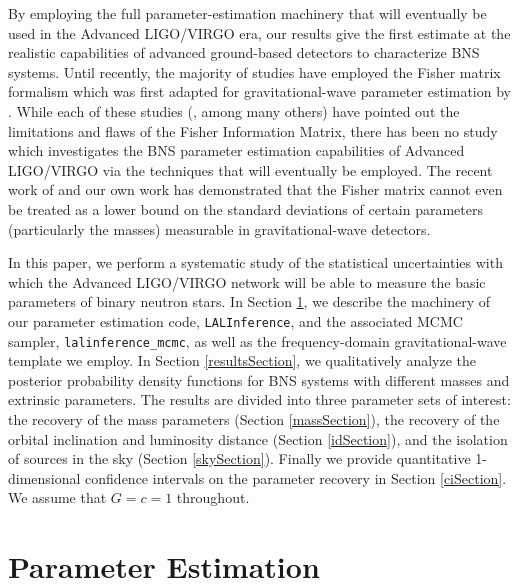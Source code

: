\documentclass[11pt,a4paper]{emulateapj}
\begin{document}
By employing the full parameter-estimation machinery that will eventually be
used in the Advanced LIGO/VIRGO era, our results give the first estimate at the 
realistic capabilities of advanced ground-based detectors to characterize BNS systems.
  Until recently, the majority of studies have employed the Fisher matrix formalism which was 
first adapted for gravitational-wave parameter estimation by \citep{FinnDetection}.
While each of these studies (\cite{PoissonWill,CutlerFlanagan,ArunPE}, among 
many others) have pointed out the limitations 
and flaws of the Fisher Information Matrix, there has been no study which investigates
the BNS parameter estimation capabilities of Advanced LIGO/VIRGO via the techniques
that will eventually be employed.  The recent work of \cite{Vallisneri} and our 
own work \citep{Inadequacies} has demonstrated that the Fisher matrix cannot even
be treated as a lower bound on the standard deviations of certain parameters
(particularly the masses) measurable in gravitational-wave detectors.

In this paper, we perform a systematic study of the statistical uncertainties with
which the Advanced LIGO/VIRGO network will be able to measure the basic parameters of 
binary neutron stars.  In Section \ref{PEsection}, we describe
the machinery of our parameter estimation code, \texttt{LALInference}, and the associated
MCMC sampler, \texttt{lalinference\_mcmc}, as well as the frequency-domain gravitational-wave template we employ.   
In Section \ref{resultsSection}, we qualitatively analyze the posterior probability density functions for BNS systems with different masses and extrinsic parameters.  The results are divided into three parameter sets of interest: the recovery of the mass parameters (Section \ref{massSection}), the recovery of the orbital inclination and luminosity distance (Section \ref{idSection}), and the isolation of sources in the sky (Section \ref{skySection}).   Finally we provide quantitative 1-dimensional confidence intervals on the parameter recovery in Section \ref{ciSection}.  We assume that $G=c=1$ throughout.

 

\section{Parameter Estimation}
\label{PEsection}
\end{document}

